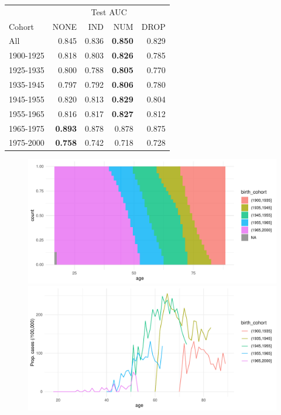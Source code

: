 \documentclass[12pt]{article}
\begin{document}
\begin{table}[ht]
\centering
\begin{tabular}{lrrrr}
  \toprule
  & \multicolumn{4}{c}{Test AUC} \\ \cmidrule(l){2-5}
Cohort & NONE & IND & NUM & DROP \\ 
  \midrule
All & 0.845 & 0.836 & \textbf{0.850} & 0.829 \\ 
  1900-1925 & 0.818 & 0.803 & \textbf{0.826} & 0.785 \\ 
  1925-1935 & 0.800 & 0.788 & \textbf{0.805} & 0.770 \\ 
  1935-1945 & 0.797 & 0.792 & \textbf{0.806} & 0.780 \\ 
  1945-1955 & 0.820 & 0.813 &\textbf{ 0.829} & 0.804 \\ 
  1955-1965 & 0.816 & 0.817 & \textbf{0.827} & 0.812 \\ 
  1965-1975 & \textbf{0.893} & 0.878 & 0.878 & 0.875 \\ 
  1975-2000 & \textbf{ 0.758} & 0.742 & 0.718 & 0.728 \\ 
   \bottomrule
\end{tabular}
\end{table}


\begin{figure}[h]
\centering
\includegraphics[width=1.0\textwidth]{figures/birthyear/age_birth.pdf}
\includegraphics[width=1.0\textwidth]{figures/birthyear/prop_cases_age_birth.pdf}
\end{figure}
\end{document}
